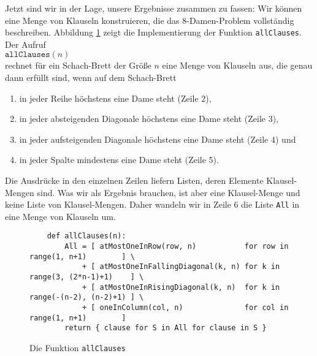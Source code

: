 Jetzt sind wir in der Lage, unsere Ergebnisse zusammen zu fassen:  Wir können eine
Menge von Klauseln konstruieren, die das 8-Damen-Problem vollständig beschreiben.
Abbildung \ref{fig:allClauses} zeigt die Implementierung der Funktion \texttt{allClauses}.
Der Aufruf \\[0.2cm]
\hspace*{1.3cm} $\texttt{allClauses}(n)$ \\[0.2cm]
rechnet für ein Schach-Brett der Größe $n$ eine Menge von Klauseln aus, die
genau dann erfüllt sind, wenn auf dem Schach-Brett
\begin{enumerate}
\item in jeder Reihe höchstens eine Dame steht (Zeile 2),
\item in jeder absteigenden Diagonale höchstens eine Dame steht (Zeile 3),
\item in jeder aufsteigenden Diagonale höchstens eine Dame steht (Zeile 4) und
\item in jeder Spalte mindestens eine Dame steht (Zeile 5).
\end{enumerate}
Die Ausdrücke in den einzelnen Zeilen liefern Listen, deren Elemente
Klausel-Mengen sind.  Was wir als Ergebnis brauchen, ist aber eine Klausel-Menge
und keine Liste von Klausel-Mengen.  Daher wandeln wir in Zeile 6 die Liste \texttt{All} in eine Menge von
Klauseln um.


\begin{figure}[!ht]
  \centering
\begin{verbatim}
    def allClauses(n):
        All = [ atMostOneInRow(row, n)           for row in range(1, n+1)        ] \
            + [ atMostOneInFallingDiagonal(k, n) for k in range(3, (2*n-1)+1)    ] \
            + [ atMostOneInRisingDiagonal(k, n)  for k in range(-(n-2), (n-2)+1) ] \
            + [ oneInColumn(col, n)              for col in range(1, n+1)        ]
        return { clause for S in All for clause in S }
\end{verbatim}
\vspace*{-0.3cm}
  \caption{Die Funktion \texttt{allClauses}}
  \label{fig:allClauses}
\end{figure}

